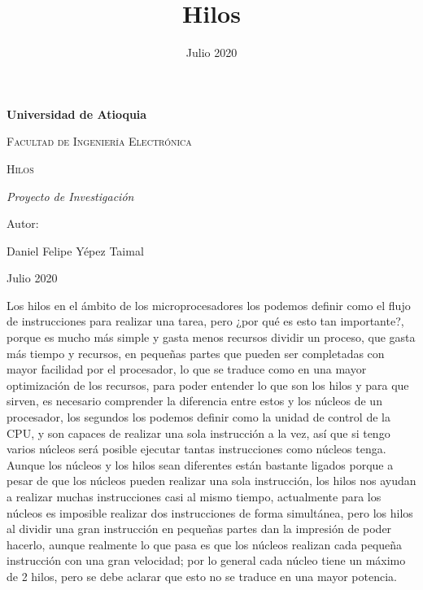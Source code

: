 \documentclass{article}
\title{Hilos}
\date{Julio 2020}
\begin{document}
\begin{titlepage}
\centering
{\bfseries\LARGE Universidad de Atioquia\par}
\vspace{1cm}
{\scshape\Large Facultad de Ingenier\'ia Electr\'onica \par}
\vspace{3cm}
{\scshape\Huge Hilos \par}
\vspace{3cm}
{\itshape\Large Proyecto de Investigaci\'on \par}
\vfill
{\Large Autor: \par}
{\Large Daniel Felipe Y\'epez Taimal \par}
\vfill
{\Large Julio 2020 \par}
\end{titlepage}

\maketitle


Los hilos en el ámbito de los microprocesadores los podemos definir como el flujo de instrucciones para realizar una tarea, pero ¿por qué es esto tan importante?, porque es mucho más simple y gasta menos recursos dividir un proceso, que gasta más tiempo y recursos, en pequeñas partes que pueden ser completadas con mayor facilidad por el procesador, lo que se traduce como en una mayor optimización de los recursos, para poder entender lo que son los hilos y para que sirven, es necesario comprender la diferencia entre estos y los núcleos de un procesador, los segundos los podemos definir como la unidad de control de la CPU, y son capaces de realizar una sola instrucción a la vez, así que si tengo varios núcleos será posible ejecutar tantas instrucciones como núcleos tenga.\\

Aunque los núcleos y los hilos sean diferentes están bastante ligados porque a pesar de que los núcleos pueden realizar una sola instrucción, los hilos nos ayudan a realizar muchas instrucciones casi al mismo tiempo, actualmente para los núcleos es imposible realizar dos instrucciones de forma simultánea, pero los hilos al dividir una gran instrucción en pequeñas partes dan la impresión de poder hacerlo, aunque realmente lo que pasa es que  los núcleos realizan cada pequeña instrucción con una gran velocidad; por lo general cada núcleo tiene un máximo de 2 hilos, pero se debe aclarar que esto no se traduce en una mayor potencia.\\
\end{document}
